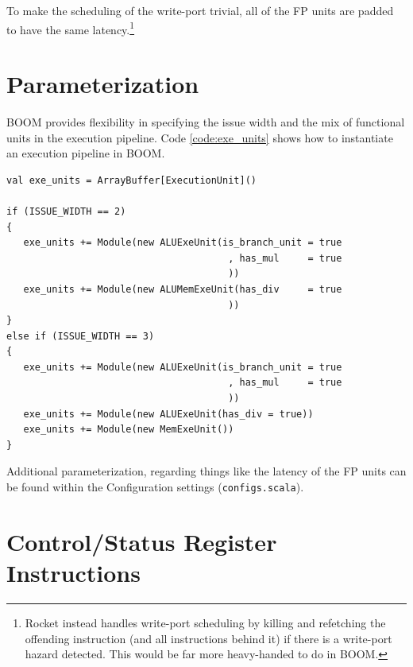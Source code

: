 To make the scheduling of the write-port trivial, all of the FP units are padded to have the same latency.\footnote{Rocket instead handles write-port scheduling by killing and refetching the offending instruction (and all instructions behind it) if there is a write-port hazard detected. This would be far more heavy-handed to do in BOOM.}



\section{Parameterization}

BOOM provides flexibility in specifying the issue width and the mix of functional units in the execution pipeline. Code \ref{code:exe_units} shows how to instantiate an execution pipeline in BOOM.
  
\begin{center}
\begin{minipage}{0.66\textwidth}
\begin{lstlisting}[caption=Instantiating the Execution Pipeline (in {\tt dpath.scala}). Adding execution units is as simple as instantiating another ExecutionUnit module and adding it to the {\tt exe\_units} ArrayBuffer.]
val exe_units = ArrayBuffer[ExecutionUnit]()

if (ISSUE_WIDTH == 2)
{
   exe_units += Module(new ALUExeUnit(is_branch_unit = true
                                       , has_mul     = true
                                       ))
   exe_units += Module(new ALUMemExeUnit(has_div     = true
                                       ))
}
else if (ISSUE_WIDTH == 3)
{
   exe_units += Module(new ALUExeUnit(is_branch_unit = true
                                       , has_mul     = true
                                       ))
   exe_units += Module(new ALUExeUnit(has_div = true))
   exe_units += Module(new MemExeUnit())
}
\end{lstlisting}\label{code:exe_units}
\end{minipage}
\end{center}

Additional parameterization, regarding things like the latency of the FP units can be found within the Configuration settings ({\tt configs.scala}).



\section{Control/Status Register Instructions}

